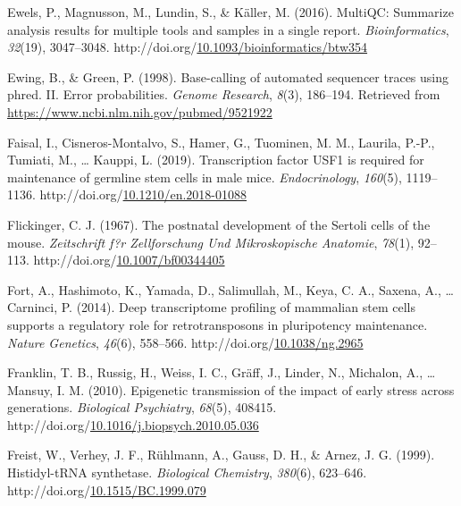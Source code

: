 \documentclass[12pt,twoside]{reedthesis}
\newlength{\cslhangindent}
\newenvironment{CSLReferences}[2] %
 {%
  \setlength{\parindent}{0pt}
  \ifodd #1 \everypar{\setlength{\hangindent}{\cslhangindent}}\ignorespaces\fi
  \ifnum #2 > 0
  \setlength{\parskip}{#2\baselineskip}
  \fi
 }%
 {}
\begin{document}
\begin{CSLReferences}{1}{0}
\leavevmode{}%
Ewels, P., Magnusson, M., Lundin, S., \& Käller, M. (2016). MultiQC: Summarize analysis results for multiple tools and samples in a single report. \emph{Bioinformatics}, \emph{32}(19), 3047--3048. http://doi.org/\href{https://doi.org/10.1093/bioinformatics/btw354}{10.1093/bioinformatics/btw354}

\leavevmode{}%
Ewing, B., \& Green, P. (1998). Base-calling of automated sequencer traces using phred. II. Error probabilities. \emph{Genome Research}, \emph{8}(3), 186--194. Retrieved from \url{https://www.ncbi.nlm.nih.gov/pubmed/9521922}

\leavevmode{}%
Faisal, I., Cisneros-Montalvo, S., Hamer, G., Tuominen, M. M., Laurila, P.-P., Tumiati, M., \ldots{} Kauppi, L. (2019). Transcription factor USF1 is required for maintenance of germline stem cells in male mice. \emph{Endocrinology}, \emph{160}(5), 1119--1136. http://doi.org/\href{https://doi.org/10.1210/en.2018-01088}{10.1210/en.2018-01088}

\leavevmode{}%
Flickinger, C. J. (1967). The postnatal development of the Sertoli cells of the mouse. \emph{Zeitschrift f?r Zellforschung Und Mikroskopische Anatomie}, \emph{78}(1), 92--113. http://doi.org/\href{https://doi.org/10.1007/bf00344405}{10.1007/bf00344405}

\leavevmode{}%
Fort, A., Hashimoto, K., Yamada, D., Salimullah, M., Keya, C. A., Saxena, A., \ldots{} Carninci, P. (2014). Deep transcriptome profiling of mammalian stem cells supports a regulatory role for retrotransposons in pluripotency maintenance. \emph{Nature Genetics}, \emph{46}(6), 558--566. http://doi.org/\href{https://doi.org/10.1038/ng.2965}{10.1038/ng.2965}

\leavevmode{}%
Franklin, T. B., Russig, H., Weiss, I. C., Gräff, J., Linder, N., Michalon, A., \ldots{} Mansuy, I. M. (2010). Epigenetic transmission of the impact of early stress across generations. \emph{Biological Psychiatry}, \emph{68}(5), 408415. http://doi.org/\href{https://doi.org/10.1016/j.biopsych.2010.05.036}{10.1016/j.biopsych.2010.05.036}

\leavevmode{}%
Freist, W., Verhey, J. F., Rühlmann, A., Gauss, D. H., \& Arnez, J. G. (1999). Histidyl-tRNA synthetase. \emph{Biological Chemistry}, \emph{380}(6), 623--646. http://doi.org/\href{https://doi.org/10.1515/BC.1999.079}{10.1515/BC.1999.079}


\end{CSLReferences}
\end{document}
